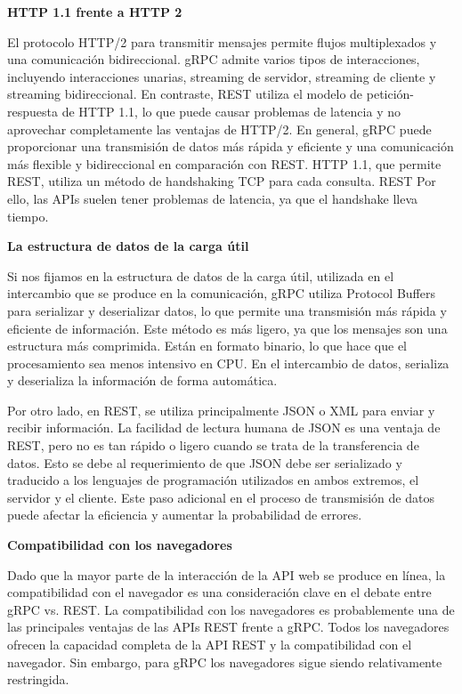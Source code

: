 \textbf{HTTP 1.1 frente a HTTP 2}

El protocolo HTTP/2 para transmitir mensajes permite flujos multiplexados y una comunicación bidireccional. gRPC admite varios tipos de interacciones, incluyendo interacciones unarias, streaming de servidor, streaming de cliente y streaming bidireccional. En contraste, REST utiliza el modelo de petición-respuesta de HTTP 1.1, lo que puede causar problemas de latencia y no aprovechar completamente las ventajas de HTTP/2. En general, gRPC puede proporcionar una transmisión de datos más rápida y eficiente y una comunicación más flexible y bidireccional en comparación con REST. HTTP 1.1, que permite REST, utiliza un método de handshaking TCP para cada consulta. REST Por ello, las APIs suelen tener problemas de latencia, ya que el handshake lleva tiempo.

\textbf{La estructura de datos de la carga útil}

Si nos fijamos en la estructura de datos de la carga útil, utilizada en el intercambio que se produce en la comunicación, gRPC utiliza Protocol Buffers para serializar y deserializar datos, lo que permite una transmisión más rápida y eficiente de información. Este método es más ligero, ya que los mensajes son una estructura más comprimida. Están en formato binario, lo que hace que el procesamiento sea menos intensivo en CPU. En el intercambio de datos, serializa y deserializa la información de forma automática.

Por otro lado, en REST, se utiliza principalmente JSON o XML para enviar y recibir información. La facilidad de lectura humana de JSON es una ventaja de REST, pero no es tan rápido o ligero cuando se trata de la transferencia de datos. Esto se debe al requerimiento de que JSON debe ser serializado y traducido a los lenguajes de programación utilizados en ambos extremos, el servidor y el cliente. Este paso adicional en el proceso de transmisión de datos puede afectar la eficiencia y aumentar la probabilidad de errores.


\textbf{Compatibilidad con los navegadores}

Dado que la mayor parte de la interacción de la API web se produce en línea, la compatibilidad con el navegador es una consideración clave en el debate entre gRPC vs. REST. La compatibilidad con los navegadores es probablemente una de las principales ventajas de las APIs REST frente a gRPC. Todos los navegadores ofrecen la capacidad completa de la API REST y la compatibilidad con el navegador. Sin embargo, para gRPC los navegadores sigue siendo relativamente restringida.

